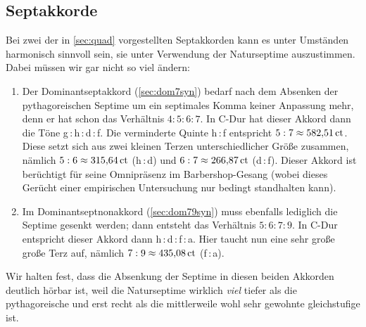 \subsection{Septakkorde}

Bei zwei der in \cref{sec:quad} vorgestellten Septakkorden kann es unter
Umständen harmonisch sinnvoll sein, sie unter Verwendung der Naturseptime
auszustimmen.  Dabei müssen wir gar nicht so viel ändern:

\begin{enumerate}
\item Der Dominantseptakkord (\cref{sec:dom7syn}) bedarf nach dem Absenken der
  pythagoreischen Septime um ein septimales Komma keiner Anpassung mehr, denn er
  hat schon das Verhältnis $4:5:6:7$. In C-Dur hat dieser Akkord dann die Töne
  g\,:\,\naturalm h\,:\,d\,:\,\septimal f.  Die verminderte Quinte \naturalm
  h\,:\,\septimal f entspricht $5:7 \approx 582{,}51\,\text{ct}$.  Diese setzt sich aus
  zwei kleinen Terzen unterschiedlicher Größe zusammen, nämlich
  $5:6 \approx 315{,}64\,\text{ct}$ (\naturalm h\,:\,d) und $6:7\approx 266{,}87\,\text{ct}$
  (d\,:\,\septimal f).  Dieser Akkord ist berüchtigt für seine Omnipräsenz im
  Barbershop-Gesang (wobei dieses Gerücht einer empirischen Untersuchung
  \cite{Barbershop} nur bedingt standhalten kann).  
\item Im Dominantseptnonakkord (\cref{sec:dom79syn}) muss ebenfalls lediglich
  die Septime gesenkt werden; dann entsteht das Verhältnis $5:6:7:9$. In C-Dur
  entspricht dieser Akkord dann \naturalm h\,:\,d\,:\,\septimal f\,:\,a.  Hier
  taucht nun eine sehr große große Terz auf, nämlich $7:9\approx 435{,}08\,\text{ct}$
  (\septimal f\,:\,a).
\end{enumerate}
Wir halten fest, dass die Absenkung der Septime in diesen beiden Akkorden
deutlich hörbar ist, weil die Naturseptime wirklich \emph{viel} tiefer als die
pythagoreische und erst recht als die mittlerweile wohl sehr gewohnte
gleichstufige ist.

